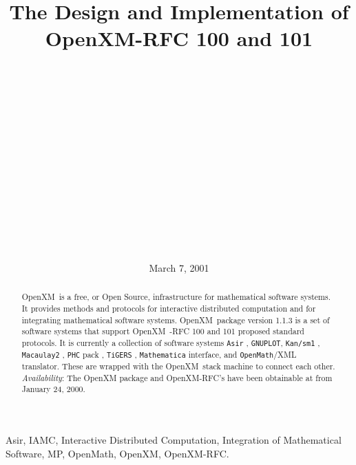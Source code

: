 \documentclass[submit]{acmconf}
\def\OpenXM{{\rm OpenXM\ }}
\begin{document}
\date{March 7, 2001}
\title{The Design and Implementation of OpenXM-RFC 100 and 101}
\author{\\
         \\
         \\
         \and
         \\
         \\
         \and
         \\
         \\
         \and
         \\
         \\
         \and
         \\
         \\
       }
\maketitle

\begin{abstract}
\OpenXM is a free, or Open Source, infrastructure for mathematical
software systems.
It provides methods and protocols 
for interactive distributed computation and
for integrating mathematical software systems.
\OpenXM package version 1.1.3 
is a set of software systems that support \OpenXM-RFC 100 and
101 proposed standard protocols.
It is currently a collection of software systems
{\tt Asir} \cite{asir}, 
{\tt GNUPLOT}, 
{\tt Kan/sm1} \cite{kan}, 
{\tt Macaulay2} \cite{Macaulay2},
{\tt PHC} pack \cite{phc}, 
{\tt TiGERS}  \cite{tigers},
{\tt Mathematica} interface, and
{\tt OpenMath}/XML \cite{OpenMath} translator.
These are wrapped with the \OpenXM stack machine
to connect each other.
{\it Availability}: The OpenXM package and OpenXM-RFC's 
have been obtainable at \cite{openxm-web}
from January 24, 2000.
\end{abstract}

\begin{keywords}
Asir,
IAMC, Interactive Distributed Computation, 
Integration of Mathematical Software,
MP, OpenMath, OpenXM, OpenXM-RFC. 
\end{keywords}
\end{document}
